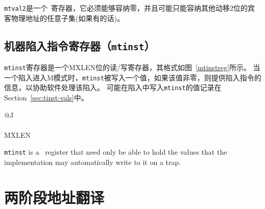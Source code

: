 {\tt mtval2}是一个\warl\ 寄存器，它必须能够容纳零，并且可能只能容纳其他动移2位的宾客物理地址的任意子集(如果有的话)。

\subsection{机器陷入指令寄存器（{\tt mtinst}）}

{\tt mtinst}寄存器是一个MXLEN位的读/写寄存器，其格式如图~\ref{mtinstreg}所示。
当一个陷入进入M模式时，{\tt mtinst}被写入一个值，如果该值非零，则提供陷入指令的信息，以协助软件处理该陷入。
可能在陷入中写入{\tt mtinst}的值记录在Section~\ref{sec:tinst-vals}中。

\begin{figure*}[h!]
{\footnotesize
\begin{center}
\begin{tabular}{@{}J}
 \\
\hline
{} \\
\hline
MXLEN \\
\end{tabular}
\end{center}
}
\vspace{-0.1in}
\caption{机器陷入指令寄存器（{\tt mtinst}）。
  }
\label{mtinstreg}
\end{figure*}

{\tt mtinst} is a \warl\ register that need only be able to hold the
values that the implementation may automatically write to it on a trap.

\section{两阶段地址翻译}
\label{sec:two-stage-translation}

